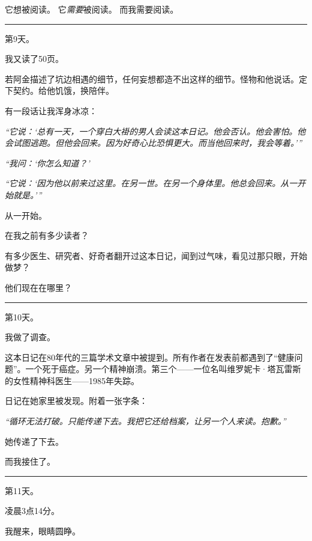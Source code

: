 \noindent 它想被阅读。
它\textit{需要}被阅读。
而我需要阅读。

\vspace{0.5em}\noindent\rule{\textwidth}{0.5pt}\vspace{0.5em}

\noindent 第9天。

\noindent 我又读了50页。

\noindent 若阿金描述了坑边相遇的细节，任何妄想都造不出这样的细节。怪物和他说话。定下契约。给他饥饿，换陪伴。

\noindent 有一段话让我浑身冰凉：

\noindent \textit{“它说：‘总有一天，一个穿白大褂的男人会读这本日记。他会否认。他会害怕。他会试图逃跑。但他会回来。因为好奇心比恐惧更大。而当他回来时，我会等着。’”}

\noindent \textit{“我问：‘你怎么知道？’}

\noindent \textit{“它说：‘因为他以前来过这里。在另一世。在另一个身体里。他总会回来。从一开始就是。’”}

\noindent 从一开始。

\noindent 在我之前有多少读者？

\noindent 有多少医生、研究者、好奇者翻开过这本日记，闻到过气味，看见过那只眼，开始做梦？

\noindent 他们现在在哪里？

\vspace{0.5em}\noindent\rule{\textwidth}{0.5pt}\vspace{0.5em}

\noindent 第10天。

\noindent 我做了调查。

\noindent 这本日记在80年代的三篇学术文章中被提到。所有作者在发表前都遇到了“健康问题”。一个死于癌症。另一个精神崩溃。第三个——一位名叫维罗妮卡·塔瓦雷斯的女性精神科医生——1985年失踪。

\noindent 日记在她家里被发现。附着一张字条：

\noindent \textit{“循环无法打破。只能传递下去。我把它还给档案，让另一个人来读。抱歉。”}

\noindent 她传递了下去。

\noindent 而我接住了。

\vspace{0.5em}\noindent\rule{\textwidth}{0.5pt}\vspace{0.5em}

\noindent 第11天。

\noindent 凌晨3点14分。

\noindent 我醒来，眼睛圆睁。

